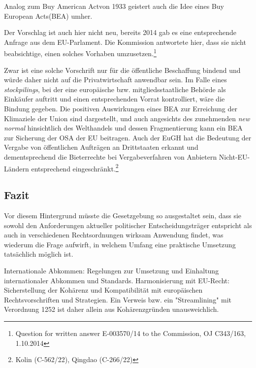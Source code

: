 \documentclass[12pt,a4paper,oneside]{book} %
\begin{document}
Analog zum \glqq Buy American Act\grqq von 1933 geistert auch die Idee eines \glqq Buy European Acts\grqq (BEA) umher.

Der Vorschlag ist auch hier nicht neu, bereits 2014 gab es eine entsprechende Anfrage aus dem EU-Parlament. Die Kommission antwortete hier, dass sie nicht beabsichtige, einen solches Vorhaben umzusetzen.\footnote{Question for written answer E-003570/14 to the Commission, OJ C343/163, 1.10.2014}

Zwar ist eine solche Vorschrift nur für die öffentliche Beschaffung bindend und würde daher nicht auf die Privatwirtschaft anwendbar sein. Im Falle eines \textit{stockpilings}, bei der eine europäische bzw. mitgliedsstaatliche Behörde als Einkäufer auftritt und einen entsprechenden Vorrat kontrolliert, wäre die Bindung gegeben.
Die positiven Auswirkungen eines BEA zur Erreichung der Klimaziele der Union sind dargestellt,\autocite{https://www.carbone4.com/en/publication-buy-european-and-sustainable-act} und auch angesichts des zunehmenden \textit{new normal} hinsichtlich des Welthandels und dessen Fragmentierung kann ein BEA zur Sicherung der OSA der EU beitragen.\autocite{https://insightplus.bakermckenzie.com/bm/international-commercial-trade/european-union-buy-european-gets-teeth}
Auch der EuGH hat die Bedeutung der Vergabe von öffentlichen Aufträgen an Drittstaaten erkannt und dementsprechend die Bieterrechte bei Vergabeverfahren von Anbietern Nicht-EU-Ländern entsprechend eingeschränkt.\footnote{Kolin (C-562/22), Qingdao (C-266/22)}

\subsection{Fazit}

Vor diesem Hintergrund müsste die Gesetzgebung so ausgestaltet sein, dass sie sowohl den Anforderungen aktueller politischer Entscheidungsträger entspricht als auch in verschiedenen Rechtsordnungen wirksam Anwendung findet, was wiederum die Frage aufwirft, in welchem Umfang eine praktische Umsetzung tatsächlich möglich ist.



Internationale Abkommen: Regelungen zur Umsetzung und Einhaltung internationaler Abkommen und Standards.
Harmonisierung mit EU-Recht: Sicherstellung der Kohärenz und Kompatibilität mit europäischen Rechtsvorschriften und Strategien.
Ein Verweis bzw. ein "Streamlining" mit Verordnung 1252 ist daher allein aus Kohärenzgründen unausweichlich.
\end{document}
